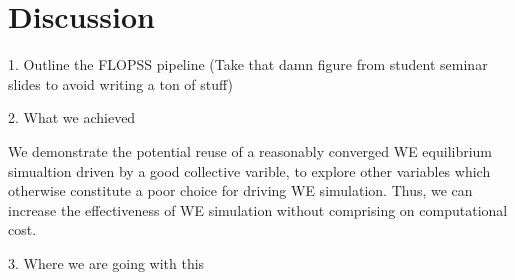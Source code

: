 \documentclass{biophys-new}
\begin{document}
\section*{Discussion}

1. Outline the FLOPSS pipeline (Take that damn figure from student seminar slides to avoid writing a ton of stuff)

2. What we achieved

We demonstrate the potential reuse of a reasonably converged WE equilibrium simualtion driven by a good collective varible, to explore other variables which otherwise constitute a poor choice for driving WE simulation.
Thus, we can increase the effectiveness of WE simulation without comprising on computational cost.

3. Where we are going with this





\end{document}

